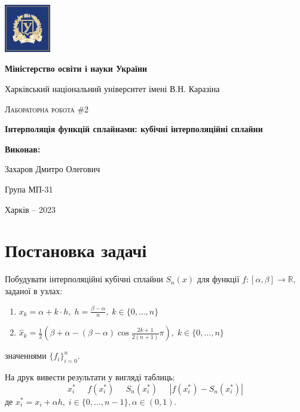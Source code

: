 \documentclass[12pt]{extarticle}
\begin{document}
\begin{titlepage}
	\centering
	\includegraphics[width=0.15\textwidth]{images/lab_1/logo.png}\par\vspace{0.3cm}
	{\textbf{Міністерство освіти і науки України}\par
 Харківський національний університет імені В.Н. Каразіна\par}
    \vspace{1cm}
	{\Large \textsc{Лабораторна робота \#2}\par
    \textbf{Інтерполяція функцій сплайнами: кубічні інтерполяційні сплайни}\par}
	\vfill
 \begin{FlushRight}
	\textbf{Виконав:}\par Захаров Дмитро Олегович \par Група МП-31
\end{FlushRight}
	\vfill

	{\large Харків -- 2023\par}
\end{titlepage}

\tableofcontents
\pagebreak

\section{Постановка задачі}

Побудувати інтерполяційні кубічні сплайни $S_n(x)$ для функції $f: [\alpha,\beta] \to \mathbb{R}$, заданої в узлах:
\begin{enumerate}
    \item $x_k = \alpha+k\cdot h, \; h = \frac{\beta-\alpha}{n}, \; k \in \{0,\dots,n\}$
    \item $\hat{x}_k = \frac{1}{2}\left(\beta+\alpha -(\beta-\alpha)\cos \frac{2k+1}{2(n+1)}\pi\right), \; k \in \{0,\dots,n\}$
\end{enumerate}

значеннями $\{f_i\}_{i=0}^n$. 

На друк вивести результати у вигляді таблиць:
\[
x_i^* \; \; \; \; \; f(x_i^*) \; \; \; \; \; S_n(x_i^*) \; \; \; \; \; |f(x_i^*) - S_n(x_i^*)|
\]
де $x_i^*=x_i+\alpha h, \; i \in \{0,\dots,n-1\}, \alpha \in (0,1)$.
\end{document}
